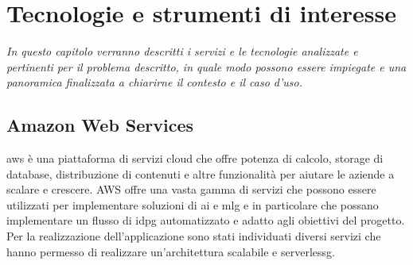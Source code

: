 \chapter{Tecnologie e strumenti di interesse}
\label{cap:tecnologie}
\emph{In questo capitolo verranno descritti i servizi e le tecnologie analizzate e pertinenti per il problema descritto, in quale modo possono essere impiegate e una panoramica finalizzata a chiarirne il contesto e il caso d'uso.}

\section{Amazon Web Services}
\gls{aws} è una piattaforma di servizi cloud che offre potenza di calcolo, storage di database, distribuzione di contenuti e altre funzionalità per aiutare le aziende a scalare e crescere. AWS offre una vasta gamma di servizi che possono essere utilizzati per implementare soluzioni di \gls{ai} e \gls{mlg} e in particolare che possano implementare un flusso di \gls{idpg} automatizzato e adatto agli obiettivi del progetto.\\
Per la realizzazione dell'applicazione sono stati individuati diversi servizi che hanno permesso di realizzare un'architettura scalabile e \gls{serverlessg}.

